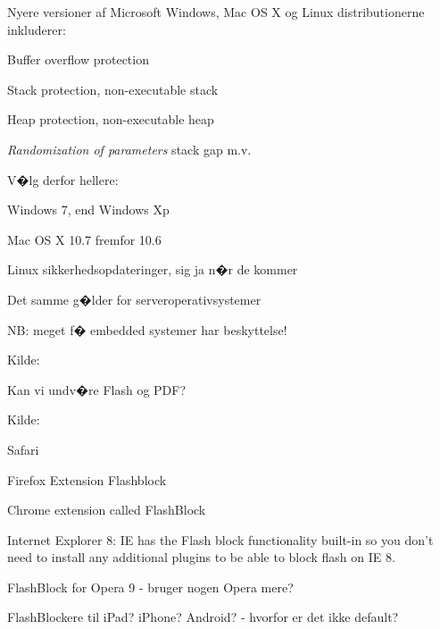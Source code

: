 \documentclass[20pt,landscape,a4paper,footrule]{foils}
\begin{document}
\begin{list1}
\item Nyere versioner af Microsoft Windows, Mac OS X og Linux distributionerne inkluderer:
\begin{list2}
\item Buffer overflow protection
\item Stack protection, non-executable stack
\item Heap protection, non-executable heap
\item \emph{Randomization of parameters} stack gap m.v.
\end{list2}
\item V�lg derfor hellere:
\begin{list2}
\item Windows 7, end Windows Xp
\item Mac OS X 10.7 fremfor 10.6
\item Linux sikkerhedsopdateringer, sig ja n�r de kommer
\end{list2}
\item Det samme g�lder for serveroperativsystemer
\item NB: meget f� embedded systemer har beskyttelse!
\end{list1}





Kilde: 



\vskip 1cm
\centerline{Kan vi undv�re Flash og PDF?}

Kilde: 




\begin{list1}
\item Safari 
\item Firefox Extension Flashblock
\item Chrome extension called FlashBlock
\item Internet Explorer 8: IE has the Flash block functionality built-in so you don't need to install any additional plugins to be able to block flash on IE 8.
\item FlashBlock for Opera 9 - bruger nogen Opera mere?
\item FlashBlockere til iPad? iPhone? Android? - hvorfor er det ikke default?
\end{list1}
\end{document}
